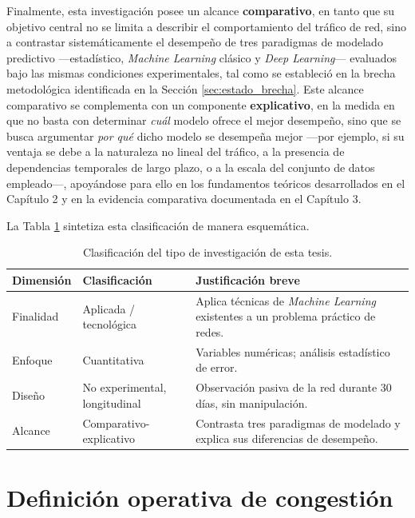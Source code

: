 \documentclass[12pt]{report}
\begin{document}
Finalmente, esta investigación posee un alcance \textbf{comparativo}, en tanto que su objetivo central no se limita a describir el comportamiento del tráfico de red, sino a contrastar sistemáticamente el desempeño de tres paradigmas de modelado predictivo ---estadístico, \textit{Machine Learning} clásico y \textit{Deep Learning}--- evaluados bajo las mismas condiciones experimentales, tal como se estableció en la brecha metodológica identificada en la Sección \ref{sec:estado_brecha}. 
Este alcance comparativo se complementa con un componente \textbf{explicativo}, en la medida en que no basta con determinar \textit{cuál} modelo ofrece el mejor desempeño, sino que se busca argumentar \textit{por qué} dicho modelo se desempeña mejor ---por ejemplo, si su ventaja se debe a la naturaleza no lineal del tráfico, a la presencia de dependencias temporales de largo plazo, o a la escala del conjunto de datos empleado---, apoyándose para ello en los fundamentos teóricos 
desarrollados en el Capítulo 2 y en la evidencia comparativa documentada en el Capítulo 3.

La Tabla \ref{tab:tipo_investigacion} sintetiza esta clasificación de manera esquemática.

\begin{table}[H]
    \centering
    \begin{tabular}{|l|l|p{6.5cm}|}
        \hline
        \textbf{Dimensión} & \textbf{Clasificación} & \textbf{Justificación breve} \\
        \hline
        Finalidad & Aplicada / tecnológica & Aplica técnicas de \textit{Machine Learning} existentes a un problema práctico de redes. \\
        \hline
        Enfoque & Cuantitativa & Variables numéricas; análisis estadístico de error. \\
        \hline
        Diseño & No experimental, longitudinal & Observación pasiva de la red durante 30 días, sin manipulación. \\
        \hline
        Alcance & Comparativo-explicativo & Contrasta tres paradigmas de modelado y explica sus diferencias de desempeño. \\
        \hline
    \end{tabular}
    \caption{Clasificación del tipo de investigación de esta tesis.}
    \label{tab:tipo_investigacion}
\end{table}

\section{Definición operativa de congestión}
\label{sec:def_operativa_metodologia}
\end{document}
